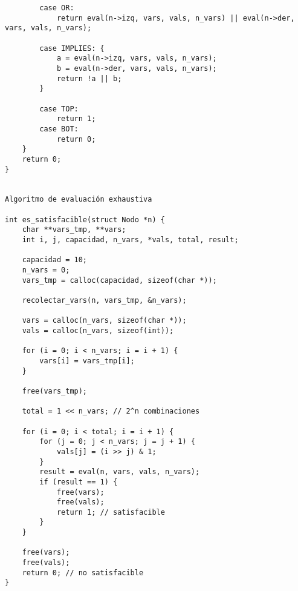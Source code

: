 \documentclass{article}
\begin{document}
\begin{verbatim}
        case OR:
            return eval(n->izq, vars, vals, n_vars) || eval(n->der, vars, vals, n_vars);

        case IMPLIES: {
            a = eval(n->izq, vars, vals, n_vars);
            b = eval(n->der, vars, vals, n_vars);
            return !a || b;
        }

        case TOP: 
            return 1;
        case BOT: 
            return 0;
    }
    return 0;
}


Algoritmo de evaluación exhaustiva

int es_satisfacible(struct Nodo *n) {
    char **vars_tmp, **vars;
    int i, j, capacidad, n_vars, *vals, total, result;

    capacidad = 10;
    n_vars = 0;
    vars_tmp = calloc(capacidad, sizeof(char *));

    recolectar_vars(n, vars_tmp, &n_vars);

    vars = calloc(n_vars, sizeof(char *));
    vals = calloc(n_vars, sizeof(int));

    for (i = 0; i < n_vars; i = i + 1) {
        vars[i] = vars_tmp[i];
    }

    free(vars_tmp);

    total = 1 << n_vars; // 2^n combinaciones

    for (i = 0; i < total; i = i + 1) {
        for (j = 0; j < n_vars; j = j + 1) {
            vals[j] = (i >> j) & 1;
        }
        result = eval(n, vars, vals, n_vars);
        if (result == 1) {
            free(vars);
            free(vals);
            return 1; // satisfacible
        }
    }

    free(vars);
    free(vals);
    return 0; // no satisfacible
}


\end{verbatim}
%
\newpage


\newpage
\end{document}
